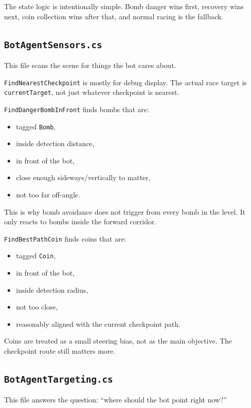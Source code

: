 \documentclass[11pt]{article}
\newcommand{\file}[1]{\texttt{#1}}
\newcommand{\code}[1]{{\footnotesize\texttt{#1}}}
\begin{document}
The state logic is intentionally simple. Bomb danger wins first, recovery wins next, coin collection wins after that, and normal racing is the fallback.

\subsection{\file{BotAgentSensors.cs}}

This file scans the scene for things the bot cares about.

\code{FindNearestCheckpoint} is mostly for debug display. The actual race target is \code{currentTarget}, not just whatever checkpoint is nearest.

\code{FindDangerBombInFront} finds bombs that are:

\begin{itemize}
    \item tagged \code{Bomb},
    \item inside detection distance,
    \item in front of the bot,
    \item close enough sideways/vertically to matter,
    \item not too far off-angle.
\end{itemize}

This is why bomb avoidance does not trigger from every bomb in the level. It only reacts to bombs inside the forward corridor.

\code{FindBestPathCoin} finds coins that are:

\begin{itemize}
    \item tagged \code{Coin},
    \item in front of the bot,
    \item inside detection radius,
    \item not too close,
    \item reasonably aligned with the current checkpoint path.
\end{itemize}

Coins are treated as a small steering bias, not as the main objective. The checkpoint route still matters more.

\subsection{\file{BotAgentTargeting.cs}}

This file answers the question: ``where should the bot point right now?''
\end{document}
